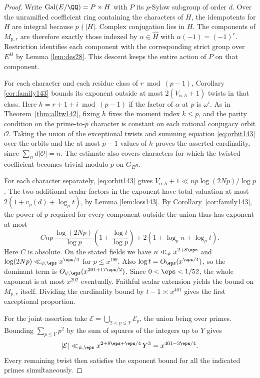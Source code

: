 \documentclass[a4paper,11pt]{article}
\theoremstyle{definition}
\theoremstyle{remark}
\numberwithin{equation}{section}
\begin{document}
\begin{proof}
Write \(\operatorname{Gal}(E/\QQ)=P\times H\) with \(P\) its
\(p\)-Sylow subgroup of order \(d\). Over the unramified
coefficient ring containing the characters of \(H\), the
idempotents for \(H\) are integral because \(p\nmid |H|\).
Complex conjugation lies in \(H\). The components of
\(M_{p,r}\) are therefore exactly those indexed by
\(\alpha\in\widehat H\) with \(\alpha(-1)=(-1)^r\).
Restriction identifies each component with the corresponding
strict group over \(E^H\) by
Lemma \ref{lem:des28}.
This descent keeps the entire action of \(P\) on that component.

For each character and each residue class of \(r\bmod(p-1)\),
Corollary \ref{cor:family143} bounds its exponent outside at most
\(2(V_{\alpha,h}+1)\) twists in that class. Here
\(h=r+1+i\bmod(p-1)\) if the factor of \(\alpha\) at \(p\)
is \(\omega^i\). As in Theorem~\ref{thm:alltw142}, fixing \(h\)
fixes the moment index \(k\le p\), and the parity condition
on the prime-to-\(p\) character is constant on each rational
conjugacy orbit \(\mathcal O\). Taking the union of the
exceptional twists and summing equation \ref{eq:orbit143} over the orbits
and the at most \(p-1\) values of \(h\) proves the asserted
cardinality, since \(\sum_{\mathcal O}d|\mathcal O|=n\).
The estimate also covers characters for which the twisted
coefficient becomes trivial modulo \(p\) on \(G_{E^H}\).

For each character separately, \eqref{eq:orbit143} gives
\(V_{\alpha,h}+1\ll n p\log(2Np)/\log p\).
The two additional scalar factors in the exponent have
total valuation at most \(2(1+v_p(d)+\log_p t)\), by
Lemma \ref{lem:loss143}. By Corollary~\ref{cor:family143}, the power of \(p\)
required for every component outside the union thus has
exponent at most
\[
 C n p\,\frac{\log(2Np)}{\log p}
                  \left(1+\frac{\log t}{\log p}\right)
        +2(1+\log_p n+\log_p t).
\]
Here \(C\) is absolute. On the stated fields we have
\(n\ll_\psi x^{2+8\eps}\) and
\(\log(2Np)\ll_{\psi,\eps}x^{\eps/4}\) for \(p\le x^{199}\).
Also \(\log t=O_\eps(x^{\eps/4})\), so the dominant term is
\(O_{\psi,\eps}(x^{201+17\eps/2})\). Since
\(0<\eps<1/52\), the whole exponent is at most \(x^{202}\)
eventually. Faithful scalar extension yields the bound on
\(M_{p,r}\) itself. Dividing the cardinality bound by
\(t-1\asymp x^{401}\) gives the first exceptional proportion.

For the joint assertion take
\(\mathcal E=\bigcup_{2<p\le Y}\mathcal E_p\), the union
being over primes. Bounding \(\sum_{p\le Y}p^2\) by the sum
of squares of the integers up to \(Y\) gives
\[
       |\mathcal E|\ll_{\psi,\eps}
            x^{2+8\eps+\eps/4}\,Y^3
               =x^{401-3\eps/4}.
\]
Every remaining twist then satisfies the exponent bound for
all the indicated primes simultaneously.
\end{proof}
\end{document}

